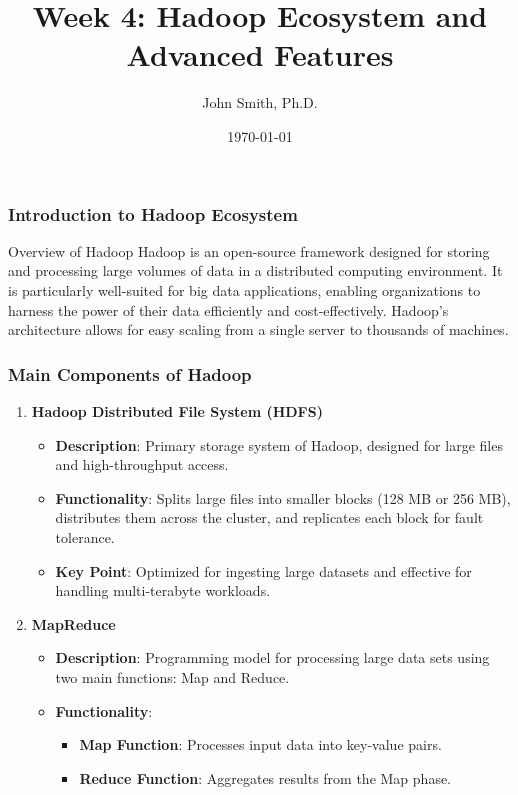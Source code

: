 \documentclass[aspectratio=169]{beamer}
\title[Hadoop Ecosystem]{Week 4: Hadoop Ecosystem and Advanced Features}
\author[J. Smith]{John Smith, Ph.D.}
\institute[University Name]{
  Department of Computer Science\\
  University Name\\
  \vspace{0.3cm}
  Email: email@university.edu\\
  Website: www.university.edu
}
\date{\today}
\begin{document}
\frame{\titlepage}

\begin{frame}[fragile]
    \frametitle{Introduction to Hadoop Ecosystem}
    \begin{block}{Overview of Hadoop}
        Hadoop is an open-source framework designed for storing and processing large volumes of data in a distributed computing environment. It is particularly well-suited for big data applications, enabling organizations to harness the power of their data efficiently and cost-effectively. Hadoop's architecture allows for easy scaling from a single server to thousands of machines.
    \end{block}
\end{frame}

\begin{frame}[fragile]
    \frametitle{Main Components of Hadoop}
    \begin{enumerate}
        \item \textbf{Hadoop Distributed File System (HDFS)}
        \begin{itemize}
            \item \textbf{Description}: Primary storage system of Hadoop, designed for large files and high-throughput access.
            \item \textbf{Functionality}: Splits large files into smaller blocks (128 MB or 256 MB), distributes them across the cluster, and replicates each block for fault tolerance.
            \item \textbf{Key Point}: Optimized for ingesting large datasets and effective for handling multi-terabyte workloads.
        \end{itemize}

        \item \textbf{MapReduce}
        \begin{itemize}
            \item \textbf{Description}: Programming model for processing large data sets using two main functions: Map and Reduce.
            \item \textbf{Functionality}:
            \begin{itemize}
                \item \textbf{Map Function}: Processes input data into key-value pairs.
                \item \textbf{Reduce Function}: Aggregates results from the Map phase.
            \end{itemize}
        \end{itemize}
    \end{enumerate}
\end{frame}
\end{document}
